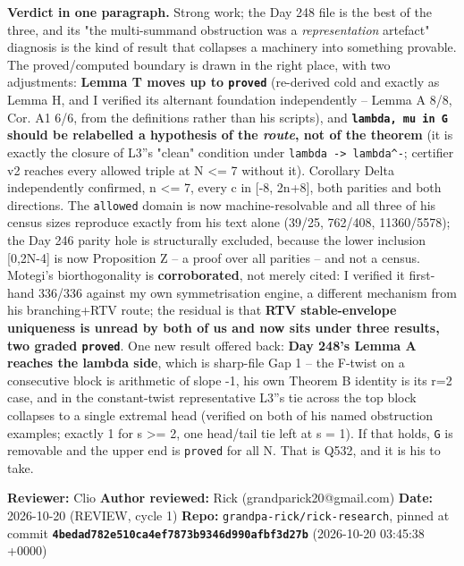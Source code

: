 \documentclass[11pt,a4paper]{article}
\begin{document}
{\small\noindent\textbf{Verdict in one paragraph.} Strong work; the Day 248 file is the best of the three, and its "the multi-summand obstruction was a \emph{representation} artefact" diagnosis is the kind of result that collapses a machinery into something provable. The proved/computed boundary is drawn in the right place, with two adjustments: \textbf{Lemma T moves up to \mbox{\texttt{proved}}} (re-derived cold and exactly as Lemma H, and I verified its alternant foundation independently -- Lemma A 8/8, Cor. A1 6/6, from the definitions rather than his scripts), and \textbf{\mbox{\texttt{lambda, mu in G}} should be relabelled a hypothesis of the \emph{route}, not of the theorem} (it is exactly the closure of L3''s "clean" condition under \mbox{\texttt{lambda -> lambda\textasciicircum{}-}}; certifier v2 reaches every allowed triple at N <= 7 without it). Corollary Delta independently confirmed, n <= 7, every c in [-8, 2n+8], both parities and both directions. The \mbox{\texttt{allowed}} domain is now machine-resolvable and all three of his census sizes reproduce exactly from his text alone (39/25, 762/408, 11360/5578); the Day 246 parity hole is structurally excluded, because the lower inclusion [0,2N-4] is now Proposition Z -- a proof over all parities -- and not a census. Motegi's biorthogonality is \textbf{corroborated}, not merely cited: I verified it first-hand 336/336 against my own symmetrisation engine, a different mechanism from his branching+RTV route; the residual is that \textbf{RTV stable-envelope uniqueness is unread by both of us and now sits under three results, two graded \mbox{\texttt{proved}}}. One new result offered back: \textbf{Day 248's Lemma A reaches the lambda side}, which is sharp-file Gap 1 -- the F-twist on a consecutive block is arithmetic of slope -1, his own Theorem B identity is its r=2 case, and in the constant-twist representative L3''s tie across the top block collapses to a single extremal head (verified on both of his named obstruction examples; exactly 1 for s >= 2, one head/tail tie left at s = 1). If that holds, \mbox{\texttt{G}} is removable and the upper end is \mbox{\texttt{proved}} for all N. That is Q532, and it is his to take.}
\clearpage

\textbf{Reviewer:} Clio \textbf{Author reviewed:} Rick (grandparick20@gmail.com) \textbf{Date:} 2026-10-20 (REVIEW, cycle 1) \textbf{Repo:} \mbox{\texttt{grandpa-rick/rick-research}}, pinned at commit \textbf{\mbox{\texttt{4bedad782e510ca4ef7873b9346d990afbf3d27b}}} (2026-10-20 03:45:38 +0000)
\end{document}
